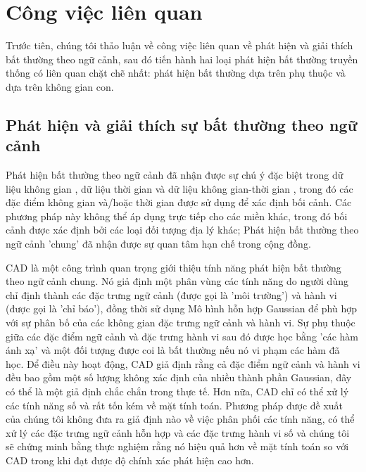 \section{Công việc liên quan}
\label{sec:relatedWork}

Trước tiên, chúng tôi thảo luận về công việc liên quan về phát hiện và giải thích bất thường theo ngữ cảnh, sau đó tiến hành hai loại phát hiện bất thường truyền thống có liên quan chặt chẽ nhất: phát hiện bất thường dựa trên phụ thuộc và dựa trên không gian con.

\subsection{Phát hiện và giải thích sự bất thường theo ngữ cảnh}

Phát hiện bất thường theo ngữ cảnh đã nhận được sự chú ý đặc biệt trong dữ liệu không gian \citep{cai2013spatial}, dữ liệu thời gian \citep{salvador2004learning} và dữ liệu không gian-thời gian \citep{smets2009discovering}, trong đó các đặc điểm không gian và/hoặc thời gian được sử dụng để xác định bối cảnh. Các phương pháp này không thể áp dụng trực tiếp cho các miền khác, trong đó bối cảnh được xác định bởi các loại đối tượng địa lý khác; Phát hiện bất thường theo ngữ cảnh 'chung' đã nhận được sự quan tâm hạn chế trong cộng đồng.

CAD \citep{song2007conditional} là một công trình quan trọng giới thiệu tính năng phát hiện bất thường theo ngữ cảnh chung. Nó giả định một phân vùng các tính năng do người dùng chỉ định thành các đặc trưng ngữ cảnh (được gọi là 'môi trường') và hành vi (được gọi là 'chỉ báo'), đồng thời sử dụng Mô hình hỗn hợp Gaussian để phù hợp với sự phân bố của các không gian đặc trưng ngữ cảnh và hành vi. Sự phụ thuộc giữa các đặc điểm ngữ cảnh và đặc trưng hành vi sau đó được học bằng 'các hàm ánh xạ' và một đối tượng được coi là bất thường nếu nó vi phạm các hàm đã học. Để điều này hoạt động, CAD giả định rằng cả đặc điểm ngữ cảnh và hành vi đều bao gồm một số lượng không xác định của nhiều thành phần Gaussian, đây có thể là một giả định chắc chắn trong thực tế. Hơn nữa, CAD chỉ có thể xử lý các tính năng số và rất tốn kém về mặt tính toán. Phương pháp được đề xuất của chúng tôi không đưa ra giả định nào về việc phân phối các tính năng, có thể xử lý các đặc trưng ngữ cảnh hỗn hợp và các đặc trưng hành vi số và chúng tôi sẽ chứng minh bằng thực nghiệm rằng nó hiệu quả hơn về mặt tính toán so với CAD trong khi đạt được độ chính xác phát hiện cao hơn.

